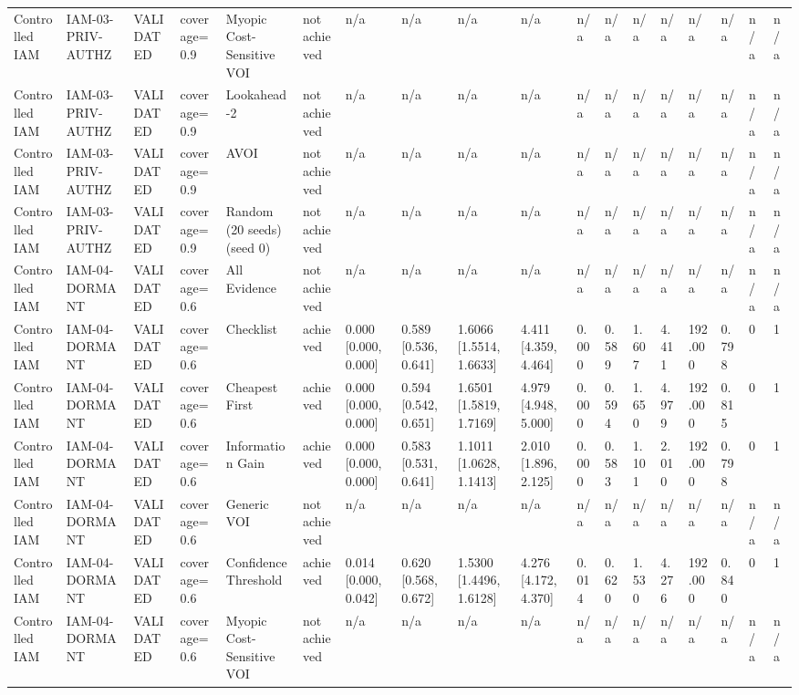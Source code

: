 \begin{table}[!ht]
{\begin{tabular}{llllllllllllllllll}
Controlled IAM & IAM-03-PRIV-AUTHZ & VALIDATED & coverage=0.9 & Myopic Cost-Sensitive VOI & not achieved & n/a & n/a & n/a & n/a & n/a & n/a & n/a & n/a & n/a & n/a & n/a & n/a \\
Controlled IAM & IAM-03-PRIV-AUTHZ & VALIDATED & coverage=0.9 & Lookahead-2 & not achieved & n/a & n/a & n/a & n/a & n/a & n/a & n/a & n/a & n/a & n/a & n/a & n/a \\
Controlled IAM & IAM-03-PRIV-AUTHZ & VALIDATED & coverage=0.9 & AVOI & not achieved & n/a & n/a & n/a & n/a & n/a & n/a & n/a & n/a & n/a & n/a & n/a & n/a \\
Controlled IAM & IAM-03-PRIV-AUTHZ & VALIDATED & coverage=0.9 & Random (20 seeds) (seed 0) & not achieved & n/a & n/a & n/a & n/a & n/a & n/a & n/a & n/a & n/a & n/a & n/a & n/a \\
Controlled IAM & IAM-04-DORMANT & VALIDATED & coverage=0.6 & All Evidence & not achieved & n/a & n/a & n/a & n/a & n/a & n/a & n/a & n/a & n/a & n/a & n/a & n/a \\
Controlled IAM & IAM-04-DORMANT & VALIDATED & coverage=0.6 & Checklist & achieved & 0.000 [0.000, 0.000] & 0.589 [0.536, 0.641] & 1.6066 [1.5514, 1.6633] & 4.411 [4.359, 4.464] & 0.000 & 0.589 & 1.607 & 4.411 & 192.000 & 0.798 & 0 & 1 \\
Controlled IAM & IAM-04-DORMANT & VALIDATED & coverage=0.6 & Cheapest First & achieved & 0.000 [0.000, 0.000] & 0.594 [0.542, 0.651] & 1.6501 [1.5819, 1.7169] & 4.979 [4.948, 5.000] & 0.000 & 0.594 & 1.650 & 4.979 & 192.000 & 0.815 & 0 & 1 \\
Controlled IAM & IAM-04-DORMANT & VALIDATED & coverage=0.6 & Information Gain & achieved & 0.000 [0.000, 0.000] & 0.583 [0.531, 0.641] & 1.1011 [1.0628, 1.1413] & 2.010 [1.896, 2.125] & 0.000 & 0.583 & 1.101 & 2.010 & 192.000 & 0.798 & 0 & 1 \\
Controlled IAM & IAM-04-DORMANT & VALIDATED & coverage=0.6 & Generic VOI & not achieved & n/a & n/a & n/a & n/a & n/a & n/a & n/a & n/a & n/a & n/a & n/a & n/a \\
Controlled IAM & IAM-04-DORMANT & VALIDATED & coverage=0.6 & Confidence Threshold & achieved & 0.014 [0.000, 0.042] & 0.620 [0.568, 0.672] & 1.5300 [1.4496, 1.6128] & 4.276 [4.172, 4.370] & 0.014 & 0.620 & 1.530 & 4.276 & 192.000 & 0.840 & 0 & 1 \\
Controlled IAM & IAM-04-DORMANT & VALIDATED & coverage=0.6 & Myopic Cost-Sensitive VOI & not achieved & n/a & n/a & n/a & n/a & n/a & n/a & n/a & n/a & n/a & n/a & n/a & n/a \\

\end{tabular}}
\end{table}
